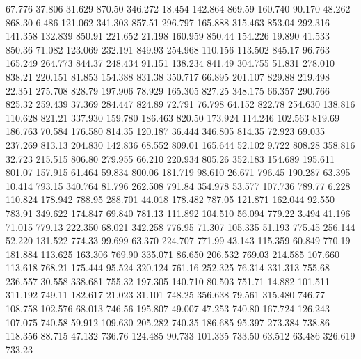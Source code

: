   67.776   37.806   31.629       870.50
 346.272   18.454  142.864       869.59
 160.740   90.170   48.262       868.30
   6.486  121.062  341.303       857.51
 296.797  165.888  315.463       853.04
 292.316  141.358  132.839       850.91
 221.652   21.198  160.959       850.44
 154.226   19.890   41.533       850.36
  71.082  123.069  232.191       849.93
 254.968  110.156  113.502       845.17
  96.763  165.249  264.773       844.37
 248.434   91.151  138.234       841.49
 304.755   51.831  278.010       838.21
 220.151   81.853  154.388       831.38
 350.717   66.895  201.107       829.88
 219.498   22.351  275.708       828.79
 197.906   78.929  165.305       827.25
 348.175   66.357  290.766       825.32
 259.439   37.369  284.447       824.89
  72.791   76.798   64.152       822.78
 254.630  138.816  110.628       821.21
 337.930  159.780  186.463       820.50
 173.924  114.246  102.563       819.69
 186.763   70.584  176.580       814.35
 120.187   36.444  346.805       814.35
  72.923   69.035  237.269       813.13
 204.830  142.836   68.552       809.01
 165.644   52.102    9.722       808.28
 358.816   32.723  215.515       806.80
 279.955   66.210  220.934       805.26
 352.183  154.689  195.611       801.07
 157.915   61.464   59.834       800.06
 181.719   98.610   26.671       796.45
 190.287   63.395   10.414       793.15
 340.764   81.796  262.508       791.84
 354.978   53.577  107.736       789.77
   6.228  110.824  178.942       788.95
 288.701   44.018  178.482       787.05
 121.871  162.044   92.550       783.91
 349.622  174.847   69.840       781.13
 111.892  104.510   56.094       779.22
   3.494   41.196   71.015       779.13
 222.350   68.021  342.258       776.95
  71.307  105.335   51.193       775.45
 256.144   52.220  131.522       774.33
  99.699   63.370  224.707       771.99
  43.143  115.359   60.849       770.19
 181.884  113.625  163.306       769.90
 335.071   86.650  206.532       769.03
 214.585  107.660  113.618       768.21
 175.444   95.524  320.124       761.16
 252.325   76.314  331.313       755.68
 236.557   30.558  338.681       755.32
 197.305  140.710   80.503       751.71
  14.882  101.511  311.192       749.11
 182.617   21.023   31.101       748.25
 356.638   79.561  315.480       746.77
 108.758  102.576   68.013       746.56
 195.807   49.007   47.253       740.80
 167.724  126.243  107.075       740.58
  59.912  109.630  205.282       740.35
 186.685   95.397  273.384       738.86
 118.356   88.715   47.132       736.76
 124.485   90.733  101.335       733.50
  63.512   63.486  326.619       733.23
